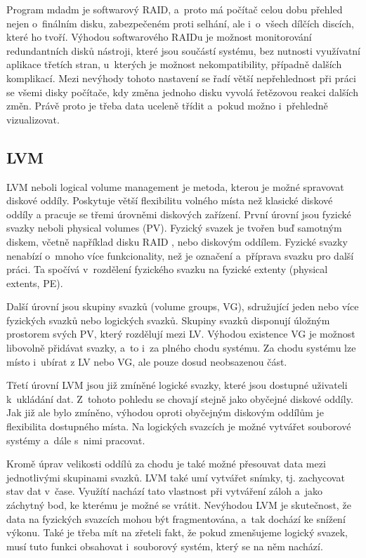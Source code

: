 \documentclass[color,table,oneside,nolot,nolof]{fithesis}
\begin{document}
	Program mdadm je softwarový RAID, a~proto má počítač celou dobu přehled nejen o~finálním disku, zabezpečeném proti selhání, ale i~o~všech dílčích discích, které ho tvoří. Výhodou
	softwarového RAIDu je
	možnost monitorování redundantních disků nástroji, které jsou součástí systému, bez nutnosti využívatní aplikace třetích stran, u~kterých je možnost nekompatibility, případně dalších 
	komplikací.
	Mezi nevýhody tohoto nastavení se řadí větší nepřehlednost při práci se všemi disky počítače, kdy změna jednoho disku vyvolá řetězovou reakci dalších změn. Právě proto je třeba data uceleně třídit
	a~pokud možno i~přehledně vizualizovat.

\subsection{LVM}
  LVM neboli logical volume management je metoda, kterou je možné spravovat diskové oddíly. Poskytuje větší flexibilitu volného místa než klasické diskové oddíly a pracuje se třemi
	úrovněmi
	diskových zařízení. První úrovní jsou fyzické svazky neboli physical volumes (PV). Fyzický svazek je tvořen buď samotným diskem, včetně například disku RAID , nebo diskovým oddílem. 
	Fyzické
	svazky nenabízí o~mnoho více funkcionality, než je označení a~příprava svazku pro další práci. Ta spočívá v~rozdělení fyzického svazku na fyzické extenty (physical extents, PE).

	Další úrovní jsou skupiny svazků (volume groups, VG), sdružující jeden nebo více fyzických svazků nebo logických svazků. Skupiny svazků disponují úložným prostorem svých PV, 
	který rozdělují mezi LV. Výhodou existence VG je možnost libovolně přidávat svazky, a~to i~za plného chodu systému. Za chodu systému lze místo i~ubírat z LV nebo VG, ale 
	pouze dosud neobsazenou část. 

	Třetí úrovní LVM jsou již zmíněné logické svazky, které jsou dostupné uživateli k~ukládání dat. Z~tohoto pohledu se chovají stejně jako obyčejné diskové oddíly. Jak již ale
	bylo zmíněno, výhodou oproti obyčejným diskovým oddílům je flexibilita dostupného místa. Na logických svazcích je možné vytvářet souborové systémy a~dále s~nimi pracovat.

	Kromě úprav velikosti oddílů za chodu je také možné přesouvat data mezi jednotlivými skupinami svazků. LVM také umí vytvářet snímky, tj. zachycovat stav dat v~čase. Využítí nachází tato 
	vlastnost
	při vytváření záloh a~jako záchytný bod, ke kterému je možné se vrátit. Nevýhodou LVM je skutečnost, že data na fyzických svazcích mohou být fragmentována, a~tak
	dochází ke snížení výkonu. Také je třeba mít na zřeteli fakt, že pokud zmenšujeme logický svazek, musí tuto funkci obsahovat i~souborový systém, který se na něm nachází.
\end{document}
